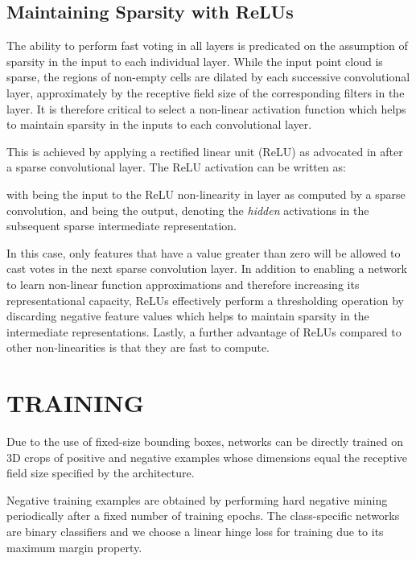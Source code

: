 \documentclass[letterpaper, 10 pt, conference]{tex_style/ieeeconf}
\begin{document}
\subsection{Maintaining Sparsity with ReLUs}
The ability to perform fast voting in all layers is predicated on the assumption of sparsity in the input to each individual layer.
While the input point cloud is sparse, the regions of non-empty cells are dilated by each successive convolutional layer, approximately by the receptive field size of the corresponding  filters in the layer.
It is therefore critical to select a non-linear activation function which helps to maintain sparsity in the inputs to each convolutional layer.

This is achieved by applying a rectified linear unit (ReLU) as advocated in \cite{glorot2011deep} after a sparse convolutional layer.
The ReLU activation can be written as:
 
 with  being the input to the ReLU non-linearity in layer  as computed by a sparse convolution, and  being the output, denoting the \emph{hidden} activations in the subsequent sparse intermediate representation.

In this case, only features that have a value greater than zero will be allowed to cast votes in the next sparse convolution layer.
In addition to enabling a network to learn non-linear function approximations and therefore increasing its representational capacity, ReLUs effectively perform a thresholding operation by discarding negative feature values which helps to maintain sparsity in the intermediate representations.
Lastly, a further advantage of ReLUs compared to other non-linearities is that they are fast to compute.
 
\section{TRAINING}
\label{sec:training}

Due to the use of fixed-size bounding boxes, networks can be directly trained on 3D crops of positive and negative examples whose dimensions equal the receptive field size specified by the architecture.

Negative training examples are obtained by performing hard negative mining periodically after a fixed number of training epochs.
The class-specific networks are binary classifiers and we choose a linear hinge loss for training due to its maximum margin property.
\end{document}

